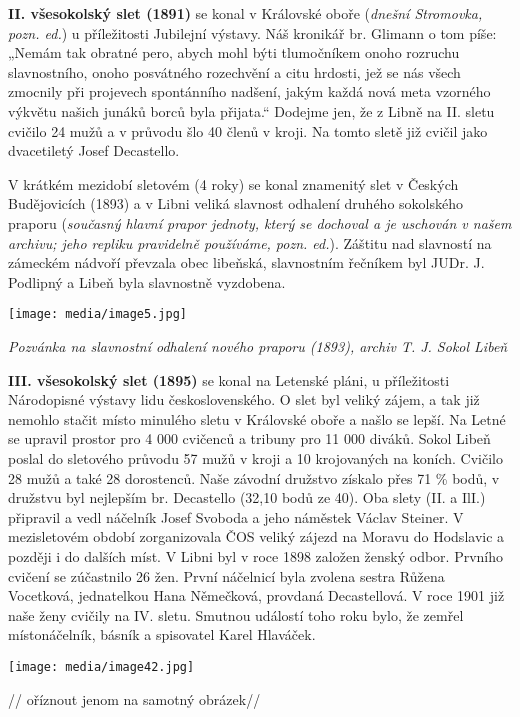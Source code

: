 \textbf{II. všesokolský slet (1891)} se konal v Královské oboře
(\emph{dnešní Stromovka, pozn. ed.}) u příležitosti Jubilejní výstavy.
Náš kronikář br. Glimann o tom píše: „Nemám tak obratné pero, abych mohl
býti tlumočníkem onoho rozruchu slavnostního, onoho posvátného
rozechvění a citu hrdosti, jež se nás všech zmocnily při projevech
spontánního nadšení, jakým každá nová meta vzorného výkvětu našich
junáků borců byla přijata.`` Dodejme jen, že z Libně na II. sletu
cvičilo 24 mužů a v průvodu šlo 40 členů v kroji. Na tomto sletě již
cvičil jako dvacetiletý Josef Decastello.

V krátkém mezidobí sletovém (4 roky) se konal znamenitý slet v Českých
Budějovicích (1893) a v Libni veliká slavnost odhalení druhého
sokolského praporu (\emph{současný hlavní prapor jednoty, který se
dochoval a je uschován v našem archivu; jeho repliku pravidelně
používáme, pozn. ed.}). Záštitu nad slavností na zámeckém nádvoří
převzala obec libeňská, slavnostním řečníkem byl JUDr. J. Podlipný a
Libeň byla slavnostně vyzdobena.

\texttt{[image: media/image5.jpg]}

\emph{Pozvánka na slavnostní odhalení nového praporu (1893), archiv T.
J. Sokol Libeň}

\textbf{III. všesokolský slet (1895)} se konal na Letenské pláni, u
příležitosti Národopisné výstavy lidu československého. O slet byl
veliký zájem, a tak již nemohlo stačit místo minulého sletu v Královské
oboře a našlo se lepší. Na Letné se upravil prostor pro 4 000 cvičenců a
tribuny pro 11 000 diváků. Sokol Libeň poslal do sletového průvodu 57
mužů v kroji a 10 krojovaných na koních. Cvičilo 28 mužů a také 28
dorostenců. Naše závodní družstvo získalo přes 71 \% bodů, v družstvu
byl nejlepším br. Decastello (32,10 bodů ze 40). Oba slety (II. a IlI.)
připravil a vedl náčelník Josef Svoboda a jeho náměstek Václav Steiner.
V mezisletovém období zorganizovala ČOS veliký zájezd na Moravu do
Hodslavic a později i do dalších míst. V Libni byl v roce 1898 založen
ženský odbor. Prvního cvičení se zúčastnilo 26 žen. První náčelnicí byla
zvolena sestra Růžena Vocetková, jednatelkou Hana Němečková, provdaná
Decastellová. V roce 1901 již naše ženy cvičily na IV. sletu. Smutnou
událostí toho roku bylo, že zemřel místonáčelník, básník a spisovatel
Karel Hlaváček.

\texttt{[image: media/image42.jpg]}

// oříznout jenom na samotný obrázek//


